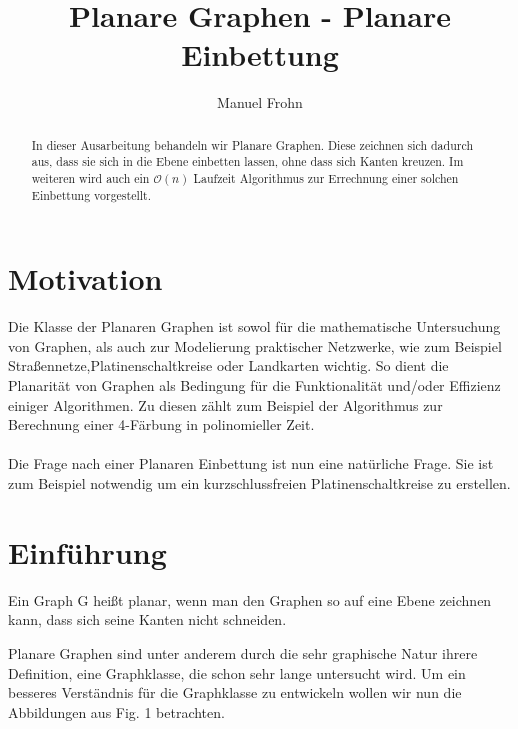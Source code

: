 \documentclass[runningheads]{llncs}
\begin{document}
\title{Planare Graphen - Planare Einbettung}
\author{Manuel Frohn}

\maketitle

\begin{abstract}
In dieser Ausarbeitung behandeln wir Planare Graphen. Diese zeichnen sich dadurch aus, dass sie sich in die Ebene einbetten lassen,
ohne dass sich Kanten kreuzen. Im weiteren wird auch ein $\mathcal{O}(n)$ Laufzeit Algorithmus zur Errechnung einer solchen Einbettung vorgestellt.
\end{abstract}

\newpage

\section{Motivation}
Die Klasse der Planaren Graphen ist sowol für die mathematische Untersuchung von Graphen, als auch zur Modelierung
praktischer Netzwerke, wie zum Beispiel Straßennetze,Platinenschaltkreise oder Landkarten wichtig. So dient die Planarität von Graphen als 
Bedingung für die Funktionalität und/oder Effizienz einiger Algorithmen. Zu diesen zählt zum Beispiel der Algorithmus zur 
Berechnung einer  4-Färbung in polinomieller Zeit.
\\
\\
Die Frage nach einer Planaren Einbettung ist nun eine natürliche Frage. Sie ist zum Beispiel notwendig um ein kurzschlussfreien Platinenschaltkreise zu erstellen.

\section{Einführung}
\begin{definition}[Planarität]
    Ein Graph G heißt planar, wenn man den Graphen so auf eine Ebene zeichnen kann, dass sich seine 
    Kanten nicht schneiden.
\end{definition}
Planare Graphen sind unter anderem durch die sehr graphische Natur ihrere Definition, eine Graphklasse, die schon sehr
lange untersucht wird. Um ein besseres Verständnis für die Graphklasse zu entwickeln wollen wir nun die Abbildungen
aus Fig. 1 betrachten.
\end{document}
